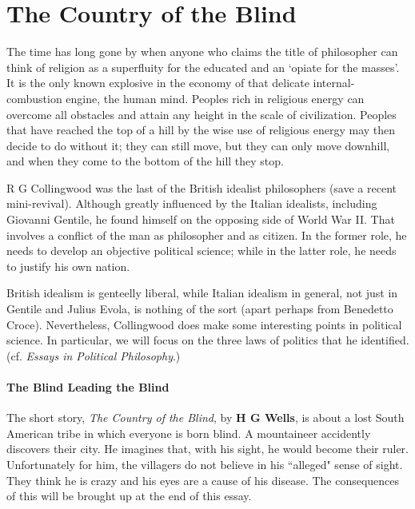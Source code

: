 \section{The Country of the Blind}

\begin{quotex}
The time has long gone by when anyone who claims the title of philosopher can think of religion as a superfluity for the educated and an `opiate for the masses'. It is the only known explosive in the economy of that delicate internal-combustion engine, the human mind. Peoples rich in religious energy can overcome all obstacles and attain any height in the scale of civilization. Peoples that have reached the top of a hill by the wise use of religious energy may then decide to do without it; they can still move, but they can only move downhill, and when they come to the bottom of the hill they stop. 

\end{quotex}
R G Collingwood was the last of the British idealist philosophers (save a recent mini-revival). Although greatly influenced by the Italian idealists, including Giovanni Gentile, he found himself on the opposing side of World War II. That involves a conflict of the man as philosopher and as citizen. In the former role, he needs to develop an objective political science; while in the latter role, he needs to justify his own nation.

British idealism is genteelly liberal, while Italian idealism in general, not just in Gentile and Julius Evola, is nothing of the sort (apart perhaps from Benedetto Croce). Nevertheless, Collingwood does make some interesting points in political science. In particular, we will focus on the three laws of politics that he identified. (cf. \emph{Essays in Political Philosophy}.)

\paragraph{The Blind Leading the Blind}
The short story, \emph{The Country of the Blind}, by \textbf{H G Wells}, is about a lost South American tribe in which everyone is born blind. A mountaineer accidently discovers their city. He imagines that, with his sight, he would become their ruler. Unfortunately for him, the villagers do not believe in his ``alleged" sense of sight. They think he is crazy and his eyes are a cause of his disease. The consequences of this will be brought up at the end of this essay.

